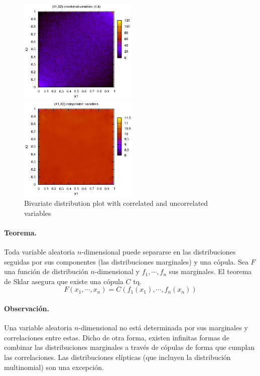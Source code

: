 \begin{figure}[!hb]
\begin{minipage}[c]{0.5\columnwidth}%
  \centering
  \includegraphics[height=5cm, angle=0]{./images/copula.eps}
\end{minipage}%
\hfill{}
\begin{minipage}[c]{0.5\columnwidth}%
  \centering
  \includegraphics[height=5cm, angle=0]{./images/uniform.eps}
\end{minipage}%
\caption{Bivariate distribution plot with correlated and uncorrelated variables}
\label{copulas}
\end{figure}

\paragraph{Teorema.}  Toda variable aleatoria $n$-dimensional
puede separarse en las distribuciones seguidas por sus componentes (las distribuciones
marginales) y una c\'opula. Sea $F$ una funci\'on de distribuci\'on $n$-dimensional y
$f_1,\cdots, f_n$ sus marginales. El teorema de Sklar asegura que existe una 
c\'opula $C$ tq.
\begin{displaymath}
F(x_1, \cdots,x_n) = C(f_1(x_1), \cdots, f_n(x_n)) 
\end{displaymath}

\paragraph{Observaci\'on.} Una variable aleatoria $n$-dimensional no est\'a 
determinada por sus marginales y correlaciones entre estas. Dicho de otra
forma, existen infinitas formas de combinar las distribuciones marginales
 a trav\'es de c\'opulas de forma que cumplan las correlaciones. Las distribuciones 
el\'ipticas (que incluyen la distribuci\'on multinomial) son una excepci\'on. 


